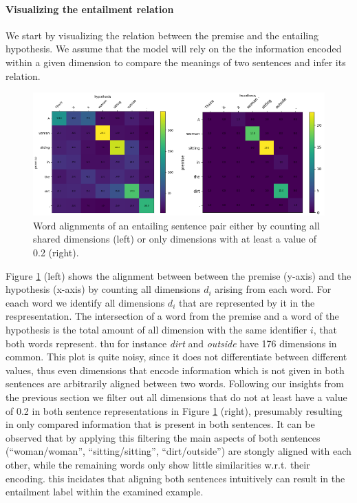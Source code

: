 \paragraph*{Visualizing the entailment relation}
We start by visualizing the relation between the premise and the entailing hypothesis. We assume that the model will rely on the the information encoded within a given dimension to compare the meanings of two sentences and infer its relation. 
\begin{figure}[tph!]
\centering
	\includegraphics[totalheight=7cm]{fig/alignment_entailment_sample_general.png}
	\caption{Word alignments of an entailing sentence pair either by counting all shared dimensions (left) or only dimensions with at least a value of 0.2 (right).}
	\label{fig:alignment_entailment_sample_general}
\end{figure}
Figure \ref{fig:alignment_entailment_sample_general} (left) shows the alignment between between the premise (y-axis) and the hypothesis (x-axis) by counting all dimensions $d_i$ arising from each word. For eaach word we identify all dimensions $d_i$ that are represented by it in the respresentation. The intersection of a word from the premise and a word of the hypothesis is the total amount of all dimension with the same identifier $i$, that both words represent. thu for instance \textit{dirt} and \textit{outside} have 176 dimensions in common. This plot is quite noisy, since it does not differentiate between different values, thus even dimensions that encode information which is not given in both sentences are arbitrarily aligned between two words. Following our insights from the previous section we filter out all dimensions that do not at least have a value of 0.2 in both sentence representations in Figure \ref{fig:alignment_entailment_sample_general} (right), presumably resulting in only compared information that is present in both sentences. It can be observed that by applying this filtering the main aspects of both sentences (``woman/woman'', ``sitting/sitting'', ``dirt/outside'') are stongly aligned with each other, while the remaining words only show little similarities w.r.t. their encoding. this incidates that aligning both sentences intuitively can result in the entailment label within the examined example.
\newline

